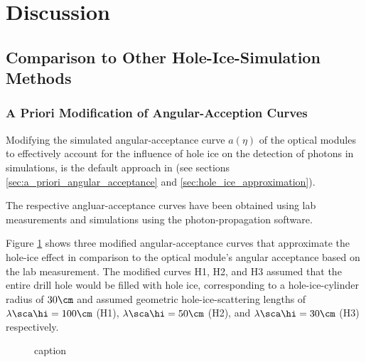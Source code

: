 
\section{Discussion}
\label{sec:discussion}

\subsection{Comparison to Other Hole-Ice-Simulation Methods}
\label{sec:comparison_methods}

\subsubsection{A Priori Modification of Angular-Acception Curves}
\label{sec:a_priori_modification_of_angular_acception_curves}\label{sec:a_priori_curve}


Modifying the simulated angular-acceptance curve $a(\eta)$ of the optical modules to effectively account for the influence of hole ice on the detection of photons in simulations, is the default approach in \clsim (see sections \ref{sec:a_priori_angular_acceptance} and \ref{sec:hole_ice_approximation}).


The respective angluar-acceptance curves have been obtained using lab measurements and simulations using the \photonics photon-propagation software. \cite{icepaper}\cite{lundberg}\cite{photonics}

Figure \ref{fig:Wee4ahYa} shows three modified angular-acceptance curves that approximate the hole-ice effect in comparison to the optical module's angular acceptance based on the lab measurement. The modified curves H1, H2, and H3 assumed that the entire drill hole would be filled with hole ice, corresponding to a hole-ice-cylinder radius of $30\cm$ and assumed geometric hole-ice-scattering lengths of $\lambda\sca\hi = 100\cm$ (H1), $\lambda\sca\hi = 50\cm$ (H2), and $\lambda\sca\hi = 30\cm$ (H3) respectively.

\begin{figure}[htbp]
  \caption{caption }
  \label{fig:Wee4ahYa}
\end{figure}

